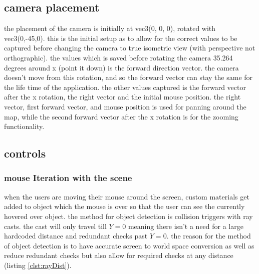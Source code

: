 \subsection{camera placement}
the placement of the camera is initially at vec3(0, 0, 0), rotated with vec3(0,-45,0). this is the initial setup as to allow for the correct values to be captured before changing the camera to true isometric view (with perspective not orthographic). the values which is saved before rotating the camera 35.264 degrees around x (point it down) is the forward direction vector. the camera doesn't move from this rotation, and so the forward vector can stay the same for the life time of the application. the other values captured is the forward vector after the x rotation, the right vector and the initial mouse position. the right vector, first forward vector, and mouse position is used for panning around the map, while the second forward vector after the x rotation is for the zooming functionality.

\subsection{controls}
\subsubsection{mouse Iteration with the scene}
when the users are moving their mouse around the screen, custom materials get added to object which the mouse is over so that the user can see the currently hovered over object. the method for object detection is collision triggers with ray casts. the cast will only travel till $Y=0$ meaning there isn't a need for a large hardcoded distance and redundant checks past $Y=0$. the reason for the method of object detection is to have accurate screen to world space conversion as well as reduce redundant checks but also allow for required checks at any distance (listing \ref{clst:rayDist}).

